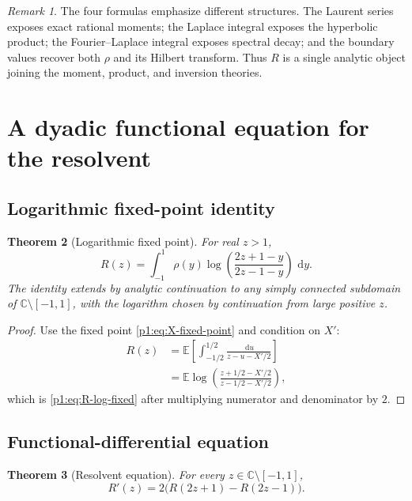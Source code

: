 \documentclass[11pt]{article}
\newtheorem{theorem}{Theorem}[section]
\theoremstyle{definition}
\theoremstyle{remark}
\newtheorem{remark}[theorem]{Remark}
\newcommand{\C}{\mathbb C}
\newcommand{\E}{\mathbb E}
\newcommand{\dd}{\,\mathrm d}
\begin{document}
\begin{remark}
The four formulas emphasize different structures.  The Laurent series exposes exact
rational moments; the Laplace integral exposes the hyperbolic product; the Fourier--Laplace
integral exposes spectral decay; and the boundary values recover both \(\rho\) and its
Hilbert transform.  Thus \(R\) is a single analytic object joining the moment, product,
and inversion theories.
\end{remark}

\section{A dyadic functional equation for the resolvent}

\subsection{Logarithmic fixed-point identity}

\begin{theorem}[Logarithmic fixed point]\label{p1:thm:R-log-fixed}
For real \(z>1\),
\begin{equation}
 R(z)=\int_{-1}^{1}\rho(y)
 \log\!\left(\frac{2z+1-y}{2z-1-y}\right)\,\dd y.           \label{p1:eq:R-log-fixed}
\end{equation}
The identity extends by analytic continuation to any simply connected subdomain of
\(\C\setminus[-1,1]\), with the logarithm chosen by continuation from large positive
\(z\).
\end{theorem}

\begin{proof}
Use the fixed point \eqref{p1:eq:X-fixed-point} and condition on \(X'\):
\begin{align*}
 R(z)
 &=\E\left[\int_{-1/2}^{1/2}
   \frac{\dd u}{z-u-X'/2}\right]\\
 &=\E\log\!\left(\frac{z+1/2-X'/2}{z-1/2-X'/2}\right),
\end{align*}
which is \eqref{p1:eq:R-log-fixed} after multiplying numerator and denominator by \(2\).
\end{proof}

\subsection{Functional-differential equation}

\begin{theorem}[Resolvent equation]\label{p1:thm:R-dde}
For every \(z\in\C\setminus[-1,1]\),
\begin{equation}
 \boxed{R'(z)=2\bigl(R(2z+1)-R(2z-1)\bigr).}                \label{p1:eq:R-dde}
\end{equation}
\end{theorem}
\end{document}
